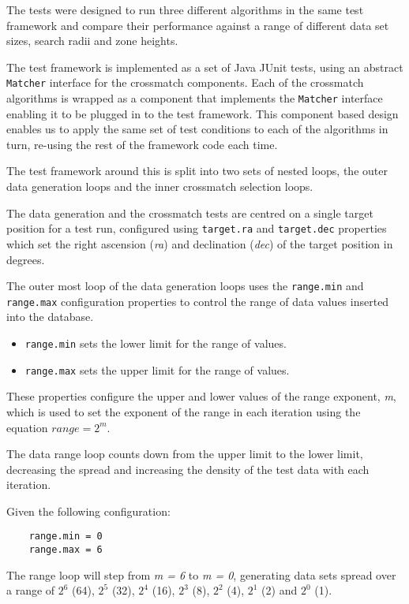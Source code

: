 \documentclass{article}
\newcommand{\junit} {JUnit\xspace}
\newcommand{\crossmatch} {crossmatch\xspace}
\begin{document}
The tests were designed to run three different algorithms in the same test framework and compare their performance against a range of different data set sizes, search radii and zone heights.

The test framework is implemented as a set of Java \junit tests, using an abstract \texttt{Matcher} interface for the \crossmatch components.
Each of the \crossmatch algorithms is wrapped as a component that implements the  \texttt{Matcher} interface enabling it to be plugged in to the test framework.
This component based design enables us to apply the same set of test conditions to each of the algorithms in turn, re-using the rest of the framework code each time.

The test framework around this is split into two sets of nested loops, the outer data generation loops and the inner \crossmatch selection loops.

The data generation and the \crossmatch tests are centred on a single target position for a test run, configured using \texttt{target.ra} and \texttt{target.dec} properties which set the right ascension (\textit{ra}) and declination (\textit{dec}) of the target position in degrees.

The outer most loop of the data generation loops uses the \texttt{range.min} and \texttt{range.max} configuration properties to control the range of data values inserted into the database.
\begin{itemize}
    \item \texttt{range.min} sets the lower limit for the range of values.
    \item \texttt{range.max} sets the upper limit for the range of values.
\end{itemize}

These properties configure the upper and lower values of the range exponent, \textit{m}, which is used to set the exponent of the range in each iteration using the equation \(range = 2^m\).

The data range loop counts down from the upper limit to the lower limit, decreasing the spread and increasing the density of the test data with each iteration.

Given the following configuration:

\begin{lstlisting}
    range.min = 0
    range.max = 6
\end{lstlisting}

The range loop will step from \textit{m = 6} to  \textit{m = 0}, generating data sets spread over a range of 
\(2^6\) (64),
\(2^5\) (32),
\(2^4\) (16),
\(2^3\) (8),
\(2^2\) (4),
\(2^1\) (2)
and
\(2^0\) (1).
\end{document}
